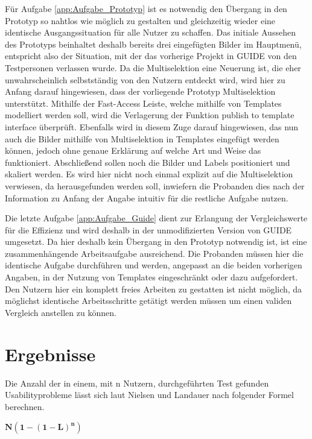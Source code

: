 Für Aufgabe \ref{app:Aufgabe_Prototyp} ist es notwendig den Übergang in den Prototyp so nahtlos wie möglich zu gestalten und gleichzeitig wieder eine identische Ausgangssituation für alle Nutzer zu schaffen.
Das initiale Aussehen des Prototyps beinhaltet deshalb bereits drei eingefügten Bilder im Hauptmenü, entspricht also der Situation, mit der das vorherige Projekt in GUIDE von den Testpersonen verlassen wurde.
Da die Multiselektion eine Neuerung ist, die eher unwahrscheinlich selbstständig von den Nutzern entdeckt wird, wird hier zu Anfang darauf hingewiesen, dass der vorliegende Prototyp Multiselektion unterstützt.
Mithilfe der Fast-Access Leiste, welche mithilfe von Templates modelliert werden soll, wird die Verlagerung der Funktion \glqq publish to template interface\grqq{} überprüft.
Ebenfalls wird in diesem Zuge darauf hingewiesen, das nun auch die Bilder mithilfe von Multiselektion in Templates eingefügt werden können, jedoch ohne genaue Erklärung auf welche Art und Weise das funktioniert.
Abschließend sollen noch die Bilder und Labels positioniert und skaliert werden.
Es wird hier nicht noch einmal explizit auf die Multiselektion verwiesen, da herausgefunden werden soll, inwiefern die Probanden dies nach der Information zu Anfang der Angabe intuitiv für die restliche Aufgabe nutzen.

Die letzte Aufgabe \ref{app:Aufgabe_Guide} dient zur Erlangung der Vergleichswerte für die Effizienz und wird deshalb in der unmodifizierten Version von GUIDE umgesetzt.
Da hier deshalb kein Übergang in den Prototyp notwendig ist, ist eine zusammenhängende Arbeitsaufgabe ausreichend.
Die Probanden müssen hier die identische Aufgabe durchführen und werden, angepasst an die beiden vorherigen Angaben, in der Nutzung von Templates eingeschränkt oder dazu aufgefordert.
Den Nutzern hier ein komplett freies Arbeiten zu gestatten ist nicht möglich, da möglichst identische Arbeitsschritte getätigt werden müssen um einen validen Vergleich anstellen zu können.

\section {Ergebnisse}
Die Anzahl der in einem, mit n Nutzern, durchgeführten Test gefunden Usabilityprobleme lässt sich laut Nielsen und Landauer nach folgender Formel berechnen.

\begin{center}
$\mathbf{N (1-(1- L ) ^n )}$ 
\end{center}

